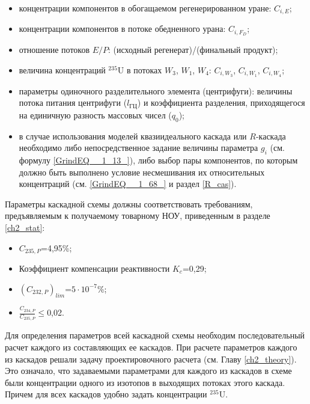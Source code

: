 \begin{itemize}
    \item концентрации компонентов в обогащаемом регенерированном уране: $C_{i,{E}}$;
    \item концентрации компонентов в потоке обедненного урана: $C_{i,{F_{D}}}$;
    \item отношение потоков $E/P$: (исходный регенерат)/(финальный продукт);
    \item величина концентраций $^{235}$U в потоках $W_{3}$, $W_{1}$, $W_{4}$: $C_{i,{W_3}}$, $C_{i,{W_1}}$, $C_{i,{W_4}}$;
    \item параметры одиночного разделительного элемента (центрифуги): величины потока питания центрифуги ($l_\textit{ГЦ}$) и коэффициента разделения, приходящегося на единичную разность массовых чисел ($q_{0}$);
    \item в случае использования моделей квазиидеального каскада или $R$-каскада необходимо либо непосредственное задание величины параметра $g_i$ (см. формулу \ref{GrindEQ__1_13_}), либо выбор пары компонентов, по которым должно быть выполнено условие несмешивания их относительных концентраций (см. \ref{GrindEQ__1_68_} и раздел \ref{R_cas}).
\end{itemize}

Параметры каскадной схемы должны соответствовать требованиям, предъявляемым к получаемому товарному НОУ, приведенным в разделе \ref{ch2_stat}:

\begin{itemize}
    \item $C_{235,{P}}$=4,95\%;
    \item Коэффициент компенсации реактивности $K_{c}$=0,29;
    \item $(C_{232,{P}})_{lim}$=$5\cdot10^{-7}$\%;
    \item $\frac{C_{234,P}}{C_{235,P}}\le$0,02.
\end{itemize}

Для определения параметров всей каскадной схемы необходим последовательный расчет каждого из составляющих ее каскадов. При расчете параметров каждого из каскадов решали задачу проектировочного расчета (см. Главу \ref{ch2_theory}). Это означало, что задаваемыми параметрами для каждого из каскадов в схеме были концентрации одного из изотопов в выходящих потоках этого каскада. Причем для всех каскадов удобно задать концентрации $^{235}$U.


